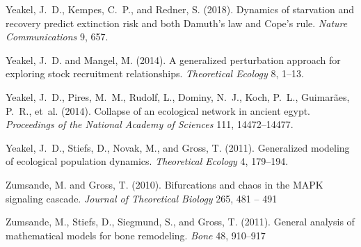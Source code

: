 \documentclass{article}
\begin{document}
\begin{thebibliography}{85}
Yeakel, J.~D., Kempes, C.~P., and Redner, S. (2018).
\newblock Dynamics of starvation and recovery predict extinction risk and both
  Damuth{'}s law and Cope{'}s rule.
\newblock \emph{Nature Communications} 9, 657.
\newblock {}

Yeakel, J.~D. and Mangel, M. (2014).
\newblock A generalized perturbation approach for exploring stock recruitment
  relationships.
\newblock \emph{Theoretical Ecology} 8, 1--13.
\newblock {}

Yeakel, J.~D., Pires, M.~M., Rudolf, L., Dominy, N.~J., Koch, P.~L.,
  Guimar\~aes, P.~R., et~al. (2014).
\newblock Collapse of an ecological network in ancient egypt.
\newblock \emph{Proceedings of the National Academy of Sciences} 111,
  14472--14477.
\newblock {}

Yeakel, J.~D., Stiefs, D., Novak, M., and Gross, T. (2011).
\newblock Generalized modeling of ecological population dynamics.
\newblock \emph{Theoretical Ecology} 4, 179--194.
\newblock {}

Zumsande, M. and Gross, T. (2010).
\newblock Bifurcations and chaos in the MAPK signaling cascade.
\newblock \emph{Journal of Theoretical Biology} 265, 481 -- 491

Zumsande, M., Stiefs, D., Siegmund, S., and Gross, T. (2011).
\newblock General analysis of mathematical models for bone remodeling.
\newblock \emph{Bone} 48, 910--917

\end{thebibliography}
\end{document}
